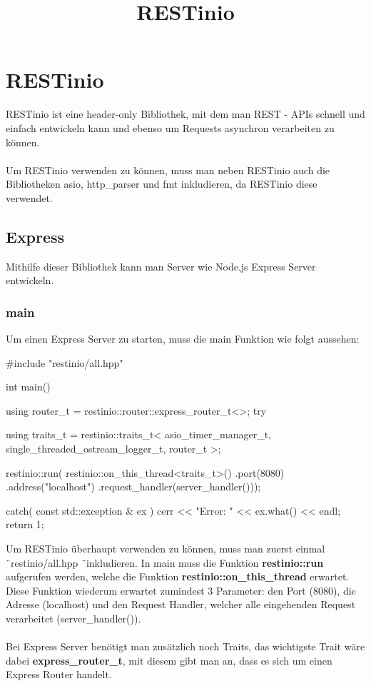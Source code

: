 \documentclass[german,oneside,color]{htldipl}
\begin{document}
\title{RESTinio}

\chapter{RESTinio}
RESTinio ist eine header-only Bibliothek, mit dem man REST - APIs schnell und einfach entwickeln kann und ebenso um Requests asynchron verarbeiten zu können.
\\ \\
Um RESTinio verwenden zu können, muss man neben RESTinio auch die Bibliotheken asio, http\_parser und fmt inkludieren, da RESTinio diese verwendet.

\section{Express}
Mithilfe dieser Bibliothek kann man Server wie Node.js Express Server entwickeln. 

\subsection{main}
Um einen Express Server zu starten, muss die main Funktion wie folgt aussehen:
\begin{program}[H]
\begin{JavaCode}
#include "restinio/all.hpp"

int main() {
    using router_t = restinio::router::express_router_t<>;
    try {
        using traits_t =
            restinio::traits_t<
                asio_timer_manager_t,
                single_threaded_ostream_logger_t,
                router_t >;
				
        restinio::run(
            restinio::on_this_thread<traits_t>()
            .port(8080)
            .address("localhost")
            .request_handler(server_handler()));
    } catch( const std::exception & ex ) {
        cerr << "Error: " << ex.what() << endl;
        return 1;
    }
}
\end{JavaCode}
\end{program}
Um RESTinio überhaupt verwenden zu können, muss man zuerst einmal \"\ restinio/all.hpp \"\ inkludieren. In main muss die Funktion \textbf{restinio::run} aufgerufen werden, welche die Funktion \textbf{restinio::on\_this\_thread} erwartet. Diese Funktion wiederum erwartet zumindest 3 Parameter: den Port (8080), die Adresse (localhost) und den Request Handler, welcher alle eingehenden Request verarbeitet (server\_handler()). 
\\ \\
Bei Express Server benötigt man zusätzlich noch Traits, das wichtigste Trait wäre dabei \textbf{express\_router\_t}, mit diesem gibt man an, dass es sich um einen Express Router handelt.
\end{document}
